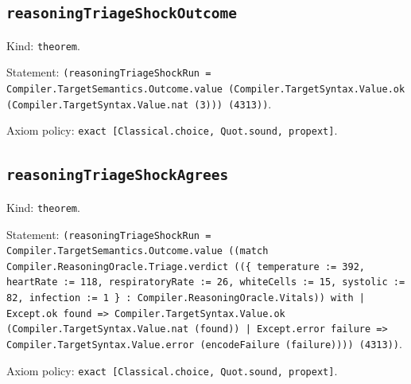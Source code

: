 \documentclass[11pt]{article}
\begin{document}
\subsection*{\texttt{reasoningTriageShockOutcome}}
\noindent Kind: \texttt{theorem}.\par
\noindent Statement: \texttt{(reasoningTriageShockRun = Compiler.TargetSemantics.Outcome.value (Compiler.TargetSyntax.Value.ok (Compiler.TargetSyntax.Value.nat (3))) (4313))}.\par
\noindent Axiom policy: \texttt{exact [Classical.choice, Quot.sound, propext]}.\par
\subsection*{\texttt{reasoningTriageShockAgrees}}
\noindent Kind: \texttt{theorem}.\par
\noindent Statement: \texttt{(reasoningTriageShockRun = Compiler.TargetSemantics.Outcome.value ((match Compiler.ReasoningOracle.Triage.verdict ((\{ temperature := 392, heartRate := 118, respiratoryRate := 26, whiteCells := 15, systolic := 82, infection := 1 \} : Compiler.ReasoningOracle.Vitals)) with | Except.ok found => Compiler.TargetSyntax.Value.ok (Compiler.TargetSyntax.Value.nat (found)) | Except.error failure => Compiler.TargetSyntax.Value.error (encodeFailure (failure)))) (4313))}.\par
\noindent Axiom policy: \texttt{exact [Classical.choice, Quot.sound, propext]}.\par
\end{document}
